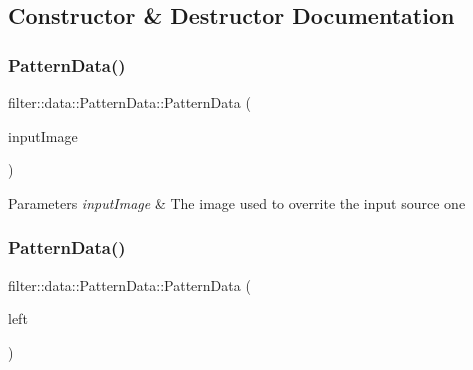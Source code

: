 \subsection{Constructor \& Destructor Documentation}
\mbox{\label{classfilter_1_1data_1_1_pattern_data_a987309a850dd3c29ffc23186efe4c7ab}} 
\subsubsection{\texorpdfstring{Pattern\+Data()}{PatternData()}\hspace{0.1cm}{\footnotesize\ttfamily [1/3]}}
{\footnotesize\ttfamily filter\+::data\+::\+Pattern\+Data\+::\+Pattern\+Data (\begin{DoxyParamCaption}\item[{\hyperlink{classfilter_1_1data_1_1_image_data}{Image\+Data} \&}]{input\+Image }\end{DoxyParamCaption})\hspace{0.3cm}{\ttfamily [inline]}}


\begin{DoxyParams}{Parameters}
{\em input\+Image} & The image used to overrite the input source one \\
\hline
\end{DoxyParams}
\mbox{\label{classfilter_1_1data_1_1_pattern_data_a947b630d84c0507db65eab7851c106a7}} 
\subsubsection{\texorpdfstring{Pattern\+Data()}{PatternData()}\hspace{0.1cm}{\footnotesize\ttfamily [2/3]}}
{\footnotesize\ttfamily filter\+::data\+::\+Pattern\+Data\+::\+Pattern\+Data (\begin{DoxyParamCaption}\item[{const std\+::vector$<$ \hyperlink{classfilter_1_1data_1_1_data}{Data} $>$ \&}]{left }\end{DoxyParamCaption})\hspace{0.3cm}{\ttfamily [inline]}}


